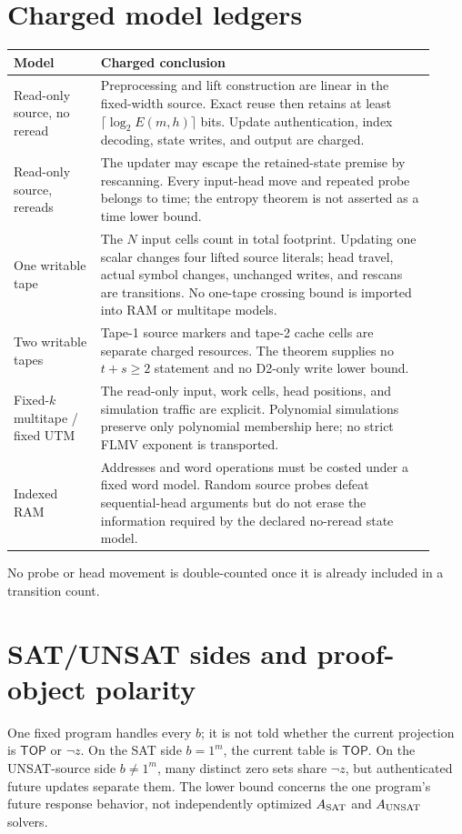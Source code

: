 \documentclass[11pt]{article}
\newcommand{\TOP}{\mathsf{TOP}}
\begin{document}
\section{Charged model ledgers}
\begin{center}
\begin{tabular}{p{0.19\linewidth}p{0.73\linewidth}}
\toprule
Model & Charged conclusion\\\midrule
Read-only source, no reread & Preprocessing and lift construction are linear in the fixed-width source.  Exact reuse then retains at least $\lceil\log_2E(m,h)\rceil$ bits.  Update authentication, index decoding, state writes, and output are charged.\\
Read-only source, rereads & The updater may escape the retained-state premise by rescanning.  Every input-head move and repeated probe belongs to time; the entropy theorem is not asserted as a time lower bound.\\
One writable tape & The $N$ input cells count in total footprint.  Updating one scalar changes four lifted source literals; head travel, actual symbol changes, unchanged writes, and rescans are transitions.  No one-tape crossing bound is imported into RAM or multitape models.\\
Two writable tapes & Tape-1 source markers and tape-2 cache cells are separate charged resources.  The theorem supplies no $t+s\ge2$ statement and no D2-only write lower bound.\\
Fixed-$k$ multitape / fixed UTM & The read-only input, work cells, head positions, and simulation traffic are explicit.  Polynomial simulations preserve only polynomial membership here; no strict FLMV exponent is transported.\\
Indexed RAM & Addresses and word operations must be costed under a fixed word model.  Random source probes defeat sequential-head arguments but do not erase the information required by the declared no-reread state model.\\
\bottomrule
\end{tabular}
\end{center}
No probe or head movement is double-counted once it is already included in a transition count.

\section{SAT/UNSAT sides and proof-object polarity}
One fixed program handles every $b$; it is not told whether the current projection is $\TOP$ or $\neg z$.  On the SAT side $b=1^m$, the current table is $\TOP$.  On the UNSAT-source side $b\ne1^m$, many distinct zero sets share $\neg z$, but authenticated future updates separate them.  The lower bound concerns the one program's future response behavior, not independently optimized $A_{\rm SAT}$ and $A_{\rm UNSAT}$ solvers.
\end{document}
